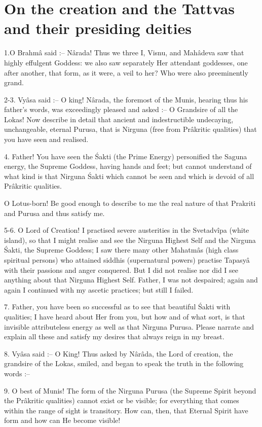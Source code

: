 \chapter{On the creation and the Tattvas and their presiding deities}

1.O Brahm\^a said :-- N\^arada! Thus we three I, Visnu, and Mah\^adeva saw that highly effulgent Goddess: we also saw separately Her attendant goddesses, one after another, that form, as it were, a veil to her? Who were also preeminently grand.

2-3. Vy\^asa said :-- O king! N\^arada, the foremost of the Munis, hearing thus his father's words, was exceedingly pleased and asked :-- O Grandsire of all the Lokas! Now describe in detail that ancient and indestructible undecaying, unchangeable, eternal Purusa, that is Nirguna (free from Pr\^akritic qualities) that you have seen and realised.

4. Father! You have seen the \'Sakti (the Prime Energy) personified the Saguna energy, the Supreme Goddess, having hands and feet; but cannot understand of what kind is that Nirguna \'Sakti which cannot be seen and which is devoid of all Pr\^akritic qualities.

O Lotus-born! Be good enough to describe to me the real nature of that Prakriti and Purusa and thus satisfy me.

5-6. O Lord of Creation! I practised severe austerities in the Svetadv\^ipa (white island), so that I might realise and see the Nirguna Highest Self and the Nirguna \'Sakti, the Supreme Goddess; I saw there many other Mahatm\^as (high class spiritual persons) who attained siddhis (supernatural powers) practise Tapasy\^a with their passions and anger conquered. But I did not realise nor did I see anything about that Nirguna Highest Self. Father, I was not despaired; again and again I continued with my ascetic practices; but still I failed.

7. Father, you have been so successful as to see that beautiful \'Sakti with qualities; I have heard about Her from you, but how and of what sort, is that invisible attributeless energy as well as that Nirguna Purusa. Please narrate and explain all these and satisfy my desires that always reign in my breast.

8. Vy\^asa said :-- O King! Thus asked by N\^ar\^ada, the Lord of creation, the grandsire of the Lokas, smiled, and began to speak the truth in the following words :--

9. O best of Munis! The form of the Nirguna Purusa (the Supreme Spirit beyond the Pr\^akritic qualities) cannot exist or be visible; for everything that comes within the range of sight is transitory. How can, then, that Eternal Spirit have form and how can He become visible!

